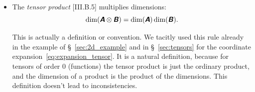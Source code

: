 \documentclass[\ifafour a4paper,12pt,\else a5paper,10pt,\fi%
onecolumn,oneside,article,%
british%
]{memoir}
\makeatletter
\theoremstyle{remark}
\theoremstyle{innote}
\newcommand*{\mathte}[1]{\textbf{\textit{\textsf{#1}}}}
\newcommand*{\de}{\partialup}%
\newcommand*{\di}{\mathrm{d}}%
\renewcommand*{\|}[1][]{\nonscript\,#1\vert\nonscript\;\mathopen{}}
\newcommand*{\sect}{\S}%
\newcommand*{\q}{}%
\DeclareRobustCommand*{\q}{%
  \mathbin{\mathpalette\bigcdot@{}}%
}
\newcommand*{\bigcdot@scalefactor}{0.75}
\newcommand*{\bigcdot@widthfactor}{1.5}
\newcommand*{\bigcdot@}[2]{%
  \sbox0{$#1\vcenter{}$}%
  \sbox2{$#1\cdot\m@th$}%
  \hbox to \bigcdot@widthfactor\wd2{%
    \hfil
    \raise\ht0\hbox{%
      \scalebox{\bigcdot@scalefactor}{%
        \lower\ht0\hbox{$#1\bullet\m@th$}%
      }%
    }%
    \hfil
  }%
}
\newcommand*{\Xx}{\textsf{X}}
\newcommand*{\Aa}{\textsf{A}}
\newcommand*{\Bb}{\textsf{B}}
\newcommand*{\yA}{\mathte{A}}
\newcommand*{\yB}{\mathte{B}}
\renewcommand*{\i}{\indices}
\newcommand*{\dex}[1][i]{\frac{\de}{\de x^{#1}}}
\newcommand*{\dix}[1][i]{\di x^{#1}}
\makeatother
\begin{document}
\begin{itemize}[wide=0pt]
\item The \emph{tensor product} [III.B.5] multiplies dimensions:
  \begin{equation}
  \dim(\yA\otimes\yB) = \dim(\yA)\dim(\yB).\label{eq:tensor_mult}
\end{equation}

This is actually a definition or convention. We tacitly used this rule
already in the example of \sect~\ref{sec:2d_example} and in
\sect~\ref{sec:tensors} for the coordinate
expansion~\eqref{eq:expansion_tensor}. It is a natural definition, because
for tensors of order 0 (functions) the tensor product is just the ordinary
product, and the dimension of a product is the product of the dimensions.
This definition doesn't lead to inconsistencies.







\end{itemize}
\end{document}

